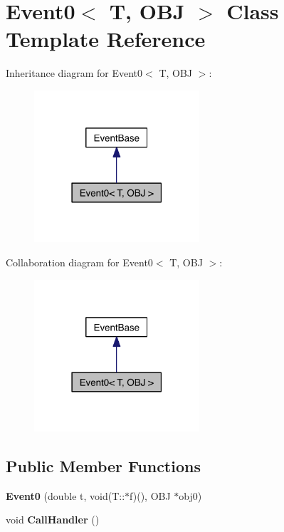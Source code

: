 \hypertarget{class_event0}{\section{Event0$<$ T, O\-B\-J $>$ Class Template Reference}
\label{class_event0}
}


Inheritance diagram for Event0$<$ T, O\-B\-J $>$\-:\nopagebreak
\begin{figure}[H]
\begin{center}
\leavevmode
\includegraphics[width=174pt]{class_event0__inherit__graph}
\end{center}
\end{figure}


Collaboration diagram for Event0$<$ T, O\-B\-J $>$\-:\nopagebreak
\begin{figure}[H]
\begin{center}
\leavevmode
\includegraphics[width=174pt]{class_event0__coll__graph}
\end{center}
\end{figure}
\subsection*{Public Member Functions}
\begin{DoxyCompactItemize}
\item 
\hypertarget{class_event0_a71a74bee8ececd124b7928bc31a662cf}{{\bfseries Event0} (double t, void(T\-::$\ast$f)(), O\-B\-J $\ast$obj0)}\label{class_event0_a71a74bee8ececd124b7928bc31a662cf}

\item 
\hypertarget{class_event0_a77176d1040ed4cc48fa750c4854212b9}{void {\bfseries Call\-Handler} ()}\label{class_event0_a77176d1040ed4cc48fa750c4854212b9}

\end{DoxyCompactItemize}
